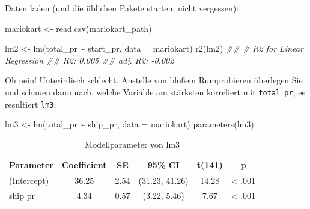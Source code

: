 \documentclass[
  letterpaper,
]{scrbook}
\newenvironment{Shaded}{\begin{snugshade}}{\end{snugshade}}
\newcommand{\AttributeTok}[1]{\textcolor[rgb]{0.40,0.45,0.13}{#1}}
\newcommand{\DocumentationTok}[1]{\textcolor[rgb]{0.37,0.37,0.37}{\textit{#1}}}
\newcommand{\FunctionTok}[1]{\textcolor[rgb]{0.28,0.35,0.67}{#1}}
\newcommand{\NormalTok}[1]{\textcolor[rgb]{0.00,0.23,0.31}{#1}}
\newcommand{\OtherTok}[1]{\textcolor[rgb]{0.00,0.23,0.31}{#1}}
\newcommand{\SpecialCharTok}[1]{\textcolor[rgb]{0.37,0.37,0.37}{#1}}
\theoremstyle{definition}
\theoremstyle{definition}
\theoremstyle{definition}
\theoremstyle{remark}
\begin{document}
Daten laden (und die üblichen Pakete starten, nicht vergessen):

\begin{Shaded}
\begin{Highlighting}[]
\NormalTok{mariokart }\OtherTok{\textless{}{-}} \FunctionTok{read.csv}\NormalTok{(mariokart\_path)}
\end{Highlighting}
\end{Shaded}

\begin{Shaded}
\begin{Highlighting}[]
\NormalTok{lm2 }\OtherTok{\textless{}{-}} \FunctionTok{lm}\NormalTok{(total\_pr }\SpecialCharTok{\textasciitilde{}}\NormalTok{ start\_pr, }\AttributeTok{data =}\NormalTok{ mariokart)}
\FunctionTok{r2}\NormalTok{(lm2)}
\DocumentationTok{\#\# \# R2 for Linear Regression}
\DocumentationTok{\#\#        R2: 0.005}
\DocumentationTok{\#\#   adj. R2: {-}0.002}
\end{Highlighting}
\end{Shaded}

Oh nein! Unterirdisch schlecht. Anstelle von bloßem Rumprobieren
überlegen Sie und schauen dann nach, welche Variable am stärksten
korreliert mit \texttt{total\_pr}; es resultiert \texttt{lm3}:

\begin{Shaded}
\begin{Highlighting}[]
\NormalTok{lm3 }\OtherTok{\textless{}{-}} \FunctionTok{lm}\NormalTok{(total\_pr }\SpecialCharTok{\textasciitilde{}}\NormalTok{ ship\_pr, }\AttributeTok{data =}\NormalTok{ mariokart)}
\FunctionTok{parameters}\NormalTok{(lm3)}
\end{Highlighting}
\end{Shaded}

\begin{longtable}[]{@{}lccccc@{}}

\caption{\label{tbl-lm3}Modellparameter von lm3}

\tabularnewline

\toprule\noalign{}
Parameter & Coefficient & SE & 95\% CI & t(141) & p \\
\midrule\noalign{}
\endhead
\bottomrule\noalign{}
\endlastfoot
(Intercept) & 36.25 & 2.54 & (31.23, 41.26) & 14.28 & \textless{}
.001 \\
ship pr & 4.34 & 0.57 & (3.22, 5.46) & 7.67 & \textless{} .001 \\

\end{longtable}
\end{document}
